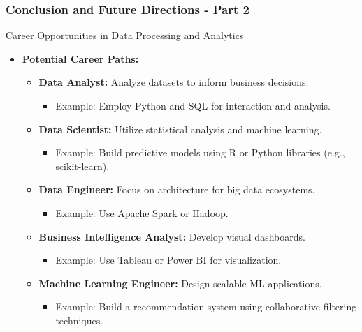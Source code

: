 \documentclass[aspectratio=169]{beamer}
\begin{document}
\begin{frame}[fragile]
    \frametitle{Conclusion and Future Directions - Part 2}
    \begin{block}{Career Opportunities in Data Processing and Analytics}
        \begin{itemize}
            \item \textbf{Potential Career Paths:}
            \begin{itemize}
                \item \textbf{Data Analyst:} Analyze datasets to inform business decisions.
                    \begin{itemize}
                        \item Example: Employ Python and SQL for interaction and analysis.
                    \end{itemize}

                \item \textbf{Data Scientist:} Utilize statistical analysis and machine learning.
                    \begin{itemize}
                        \item Example: Build predictive models using R or Python libraries (e.g., scikit-learn).
                    \end{itemize}

                \item \textbf{Data Engineer:} Focus on architecture for big data ecosystems.
                    \begin{itemize}
                        \item Example: Use Apache Spark or Hadoop.
                    \end{itemize}

                \item \textbf{Business Intelligence Analyst:} Develop visual dashboards.
                    \begin{itemize}
                        \item Example: Use Tableau or Power BI for visualization.
                    \end{itemize}

                \item \textbf{Machine Learning Engineer:} Design scalable ML applications.
                    \begin{itemize}
                        \item Example: Build a recommendation system using collaborative filtering techniques.
                    \end{itemize}
            \end{itemize}
        \end{itemize}
    \end{block}
\end{frame}
\end{document}
